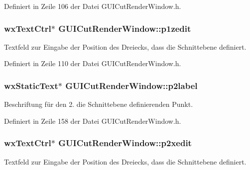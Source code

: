 Definiert in Zeile 106 der Datei G\-U\-I\-Cut\-Render\-Window.\-h.

\hypertarget{classGUICutRenderWindow_a5843efcb13e1d56ea95932d052e5666a}{
\subsubsection[{p1zedit}]{\setlength{\rightskip}{0pt plus 5cm}wx\-Text\-Ctrl$\ast$ G\-U\-I\-Cut\-Render\-Window\-::p1zedit\hspace{0.3cm}{\ttfamily [private]}}}\label{classGUICutRenderWindow_a5843efcb13e1d56ea95932d052e5666a}
Textfeld zur Eingabe der Position des Dreiecks, dass die Schnittebene definiert. 

Definiert in Zeile 110 der Datei G\-U\-I\-Cut\-Render\-Window.\-h.

\hypertarget{classGUICutRenderWindow_adc1202b42f220ea7b8a8830f4d9d322a}{
\subsubsection[{p2label}]{\setlength{\rightskip}{0pt plus 5cm}wx\-Static\-Text$\ast$ G\-U\-I\-Cut\-Render\-Window\-::p2label\hspace{0.3cm}{\ttfamily [private]}}}\label{classGUICutRenderWindow_adc1202b42f220ea7b8a8830f4d9d322a}
Beschriftung für den 2. die Schnittebene definierenden Punkt. 

Definiert in Zeile 158 der Datei G\-U\-I\-Cut\-Render\-Window.\-h.

\hypertarget{classGUICutRenderWindow_a5d2bcd96c6fdb8d629583c5d40ccdbcc}{
\subsubsection[{p2xedit}]{\setlength{\rightskip}{0pt plus 5cm}wx\-Text\-Ctrl$\ast$ G\-U\-I\-Cut\-Render\-Window\-::p2xedit\hspace{0.3cm}{\ttfamily [private]}}}\label{classGUICutRenderWindow_a5d2bcd96c6fdb8d629583c5d40ccdbcc}
Textfeld zur Eingabe der Position des Dreiecks, dass die Schnittebene definiert. 

